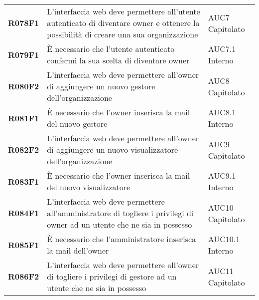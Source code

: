 \documentclass[../analisi-dei-requisiti.tex]{subfiles}
\begin{document}
\begin{longtable}[H]{>{\centering\bfseries}m{3cm} >{\centering}m{10cm} >{\centering\arraybackslash}m{3cm}}
  R078F1                               & L'interfaccia web deve permettere all'utente autenticato di diventare owner e ottenere la possibilità di creare una sua organizzazione                                                                  & AUC7 Capitolato               \\
  R079F1                               & È necessario che l'utente autenticato confermi la sua scelta di diventare owner                                                                                                                         & AUC7.1 Interno                \\
  R080F2                               & L'interfaccia web deve permettere all'owner di aggiungere un nuovo gestore dell'organizzazione                                                                                                          & AUC8 Capitolato               \\
  R081F1                               & È necessario che l'owner inserisca la mail del nuovo gestore                                                                                                                                            & AUC8.1 Interno                \\
  R082F2                               & L'interfaccia web deve permettere all'owner di aggiungere un nuovo visualizzatore dell'organizzazione                                                                                                   & AUC9 Capitolato               \\
  R083F1                               & È necessario che l'owner inserisca la mail del nuovo visualizzatore                                                                                                                                     & AUC9.1 Interno                \\
  R084F1                               & L'interfaccia web deve permettere all'amministratore di togliere i privilegi di owner ad un utente che ne sia in possesso                                                                               & AUC10 Capitolato              \\
  R085F1                               & È necessario che l'amministratore inserisca la mail dell'owner                                                                                                                                          & AUC10.1 Interno               \\
  R086F2                               & L'interfaccia web deve permettere all'owner di togliere i privilegi di gestore ad un utente che ne sia in possesso                                                                                      & AUC11 Capitolato              \\

\end{longtable}
\end{document}
